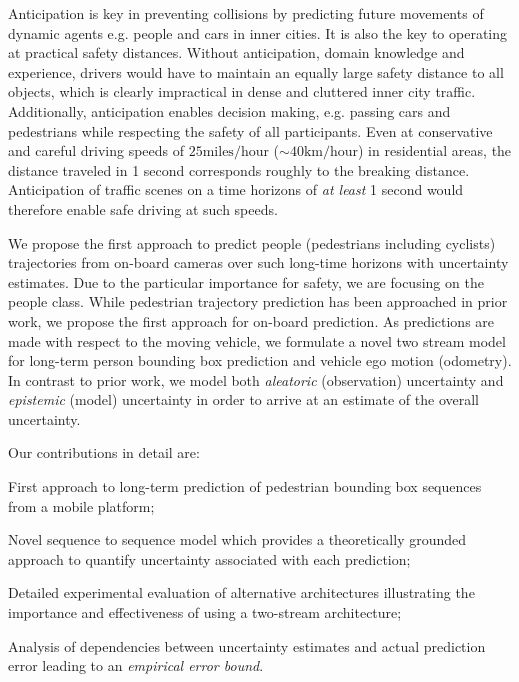 Anticipation is key in preventing collisions by predicting future movements of dynamic agents e.g. people and cars in inner cities. It is also the key to operating at practical safety distances. Without anticipation, domain knowledge and experience, drivers would have to maintain an equally large safety distance to all objects, which is clearly impractical in dense and cluttered inner city traffic. Additionally, anticipation enables decision making, e.g. passing cars and pedestrians while respecting the safety of all participants. Even at conservative and careful driving speeds of $25   {\text{miles}}/{\text{hour}}$ ($\sim 40 {\text{km}}/{\text{hour}}$) in residential areas, the distance traveled in 1 second corresponds roughly to the breaking distance. Anticipation of traffic scenes on a time horizons of \emph{at least} 1 second would therefore enable safe driving at such speeds. 



We propose the first approach to predict people (pedestrians including cyclists) trajectories from on-board cameras over such long-time horizons with uncertainty estimates. Due to the particular importance for safety, we are focusing on the people class. While pedestrian trajectory prediction has been approached in prior work, we propose the first approach for on-board prediction. As predictions are made with respect to the moving vehicle, we formulate a novel two stream model for long-term person bounding box prediction and vehicle ego motion (odometry).  In contrast to prior work, we model both \emph{aleatoric} (observation) uncertainty and \emph{epistemic} (model) uncertainty \cite{der2009aleatory} in order to arrive at an estimate of the overall uncertainty.

Our contributions in detail are:
\begin{enumerate*}
    \item First approach to long-term prediction of pedestrian bounding box sequences from a mobile platform;
    \item Novel sequence to sequence model which provides a theoretically grounded approach to quantify uncertainty associated with each prediction;
    \item Detailed experimental evaluation of alternative architectures illustrating the importance and effectiveness of using a two-stream architecture;
    \item Analysis of dependencies between uncertainty estimates and actual prediction error leading to an \emph{empirical error bound}.
\end{enumerate*}